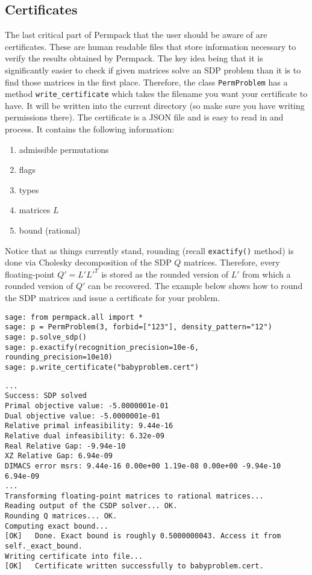 \documentclass[12pt, a4paper, twoside]{report}
\begin{document}
\subsection{Certificates}
\label{subsec:certificates}
The last critical part of Permpack that the user should be aware of are certificates. These are human readable files that store information necessary to verify the results obtained by Permpack. The key idea being that it is significantly easier to check if given matrices solve an SDP problem than it is to find those matrices in the first place. Therefore, the class \texttt{PermProblem} has a method \texttt{write\_certificate} which takes the filename you want your certificate to have. It will be written into the current directory (so make sure you have writing permissions there). The certificate is a JSON file and is easy to read in and process. It contains the following information:
\begin{enumerate}
\item admissible permutations
\item flags
\item types
\item matrices $L$
\item bound (rational)
\end{enumerate}
Notice that as things currently stand, rounding (recall \texttt{exactify()} method) is done via Cholesky decomposition of the SDP $Q$ matrices. Therefore, every floating-point $Q' = L'L'^T$ is stored as the rounded version of $L'$ from which a rounded version of $Q'$ can be recovered. The example below shows how to round the SDP matrices and issue a certificate for your problem.

 {}
\begin{lstlisting}
sage: from permpack.all import *
sage: p = PermProblem(3, forbid=["123"], density_pattern="12")
sage: p.solve_sdp()
sage: p.exactify(recognition_precision=10e-6, rounding_precision=10e10)
sage: p.write_certificate("babyproblem.cert")
\end{lstlisting}

\begin{lstlisting}
...
Success: SDP solved
Primal objective value: -5.0000001e-01 
Dual objective value: -5.0000001e-01 
Relative primal infeasibility: 9.44e-16 
Relative dual infeasibility: 6.32e-09 
Real Relative Gap: -9.94e-10 
XZ Relative Gap: 6.94e-09 
DIMACS error msrs: 9.44e-16 0.00e+00 1.19e-08 0.00e+00 -9.94e-10 6.94e-09
...
Transforming floating-point matrices to rational matrices...
Reading output of the CSDP solver... OK.
Rounding Q matrices... OK.
Computing exact bound...
[OK]   Done. Exact bound is roughly 0.5000000043. Access it from
self._exact_bound.
Writing certificate into file... 
[OK]   Certificate written successfully to babyproblem.cert.
\end{lstlisting}
\end{document}

